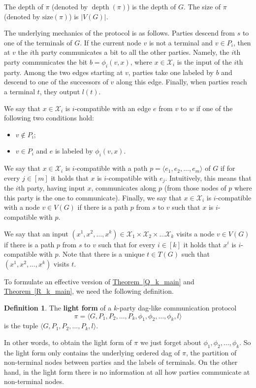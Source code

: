 \documentclass[11pt]{article}
\numberwithin{equation}{section}
\theoremstyle{definition}
\newtheorem{definition}[theorem]{Definition}
\theoremstyle{plain}
\newcommand{\expref}[2]{\hyperref[#2]{#1~\ref{#2}}}
\DeclareMathOperator{\depth}{depth}  %
\begin{document}
The depth of $\pi$ (denoted by $\depth(\pi)$) is the depth of $G$. The size of $\pi$ (denoted by $\mathrm{size}(\pi)$) is  $|V(G)|$.


 The underlying mechanics of the protocol is as follows. Parties descend from $s$ to one of the terminals of $G$. If the current node $v$ is not a terminal and $v\in P_i$, then at $v$ the $i$th party communicates a bit to all the other parties. Namely, the $i$th party communicates the bit $b = \phi_i(v, x)$, where $x\in\mathcal{X}_i$ is the input of the $i$th party. Among the two edges starting at $v$, parties take one labeled by $b$ and descend to one of the successors of $v$ along this edge. Finally, when parties reach a terminal $t$, they output $l(t)$. 

We say that $x\in\mathcal{X}_i$ is $i$-compatible with an edge $e$ from
$v$ to $w$ if one of the following two %
conditions hold:  %
\begin{itemize}
\item $v\notin P_i$;
\item $v\in P_i$ and $e$ is labeled by $\phi_i(v, x)$.
\end{itemize}
We say that $x\in \mathcal{X}_i$ is $i$-compatible with  a path $p = \langle e_1, e_2, \ldots, e_m\rangle$ of $G$ if for every $j\in [m]$ it holds that $x$ is $i$-compatible with $e_j$. Intuitively, this means that the $i$th party, having input $x$, communicates along $p$ (from those nodes of $p$ where this party is the one to communicate).
Finally, we say that $x\in\mathcal{X}_i$ is $i$-compatible with a node $v\in V(G)$ if there is a path $p$ from $s$ to $v$ such that $x$ is $i$-compatible with $p$.

We say that an input  $(x^1, x^2, \ldots, x^k) \in \mathcal{X}_1 \times \mathcal{X}_2 \times \ldots \mathcal{X}_k$ visits a node $v\in V(G)$ if there is a path $p$ from $s$ to $v$ such that for every $i\in [k]$ it holds that $x^i$ is $i$-compatible with $p$. Note that there is a unique $t\in T(G)$ such that $(x^1, x^2, \ldots, x^k)$ visits $t$.





To formulate an effective version of \expref{Theorem}{Q_k_main} and \expref{Theorem}{R_k_main}, we need the following definition.
\begin{definition}
\label{light_form}
The \textbf{light form} of a $k$-party dag-like communication protocol
%
\[
\pi = \langle G, P_1, P_2, \ldots, P_k, \phi_1, \phi_2, \ldots, \phi_k, l\rangle
\]
is %
%
%
the  %
tuple $\langle G, P_1, P_2, \ldots, P_k, l\rangle$.
\end{definition}
%
In other words,  %
to obtain the light form of $\pi$ we just forget about $\phi_1, \phi_2, \ldots, \phi_k$. %
So  %
the light form only contains  the underlying ordered dag of $\pi$, the partition of non-terminal nodes between parties and the labels of terminals. On the other hand, in the light form there is no information at all how parties communicate at non-terminal nodes.
\end{document}
